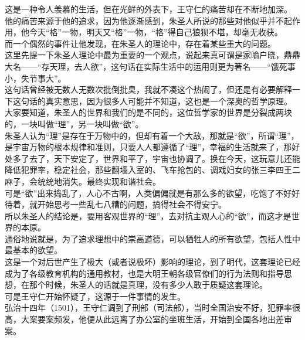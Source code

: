 \begin{multicols}{\theparacolNo}
这是一种令人羡慕的生活，但在光鲜的外表下，王守仁的痛苦却在不断地加深。\\

他的痛苦来源于他的追求，因为他逐渐感到，朱圣人所说的那些对他似乎并不起作用，他今天“格”一物，明天又“格”一物，“格”得自己狼狈不堪，却毫无收获。\\

而一个偶然的事件让他发现，在朱圣人的理论中，存在着某些重大的问题。\\

这里先提一下朱圣人理论中最为重要的一个观点，说起来真可谓是家喻户晓，鼎鼎大名——“存天理，去人欲”，这句话在实际生活中的运用则更为著名——“饿死事小，失节事大”。\\

这句话曾经被无数人无数次批倒批臭，我就不凑这个热闹了，但还是有必要解释一下这句话的真实意思，因为很多人可能并不知道，这也是一个深奥的哲学原理。\\

大家要知道，朱圣人的世界和我们的是不同的，这位哲学家的世界是分裂成两块的，一块叫做“理”，另一块叫做“欲”。\\

朱圣人认为“理”是存在于万物中的，但却有着一个大敌，那就是“欲”，所谓“理”，是宇宙万物的根本规律和准则，只要人人都遵循了“理”，幸福的生活就来了，那好处多了去了，天下安定了，世界和平了，宇宙也协调了。换在今天，这玩意儿还能降低犯罪率，稳定社会，那些翻墙入室的、飞车抢包的、调戏妇女的张三李四王二麻子，会统统地消失。最终实现和谐社会。\\

可是“欲”出来捣乱了，人心不古啊，人类偏偏就是有那么多的欲望，吃饱了不好好待着，就开始思考一些乱七八糟的问题，搞得社会不得安宁。\\

所以朱圣人的结论是，要用客观世界的“理”，去对抗主观人心的“欲”，而这才是世界的本原。\\

通俗地说就是，为了追求理想中的崇高道德，可以牺牲人的所有欲望，包括人性中最基本的欲望。\\

这是一个对后世产生了极大（或者说极坏）影响的理论，到了明代，这套理论已经成为了各级教育机构的通用教材，也是大明王朝各级官僚们的行为法则和指导思想，在那个时候，朱圣人的话就是真理，没有多少人敢于质疑这套理论。\\

可是王守仁开始怀疑了，这源于一件事情的发生。\\

弘治十四年（1501），王守仁调到了刑部（司法部），当时全国治安不好，犯罪率很高，大案要案频发，他便从此远离了办公室的坐班生活，开始到全国各地出差审案。\\


\end{multicols}
